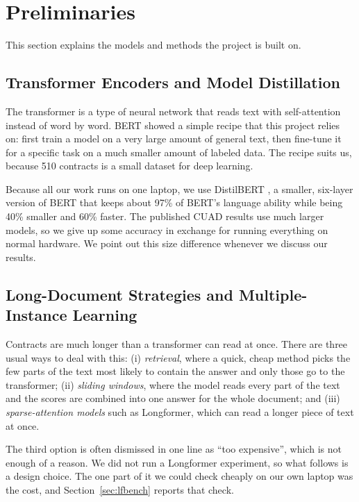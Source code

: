 \section{Preliminaries}
This section explains the models and methods the project is built on.

\subsection{Transformer Encoders and Model Distillation}
The transformer \cite{vaswani2017attention} is a type of neural network that reads text with self-attention instead of word by word. BERT \cite{devlin2019bert} showed a simple recipe that this project relies on: first train a model on a very large amount of general text, then fine-tune it for a specific task on a much smaller amount of labeled data. The recipe suits us, because 510 contracts is a small dataset for deep learning.

Because all our work runs on one laptop, we use DistilBERT \cite{sanh2019distilbert}, a smaller, six-layer version of BERT that keeps about 97\% of BERT's language ability while being 40\% smaller and 60\% faster. The published CUAD results use much larger models, so we give up some accuracy in exchange for running everything on normal hardware. We point out this size difference whenever we discuss our results.

\subsection{Long-Document Strategies and Multiple-Instance Learning}
\label{sec:lit_long}
Contracts are much longer than a transformer can read at once. There are three usual ways to deal with this: (i) \emph{retrieval}, where a quick, cheap method picks the few parts of the text most likely to contain the answer and only those go to the transformer; (ii) \emph{sliding windows}, where the model reads every part of the text and the scores are combined into one answer for the whole document; and (iii) \emph{sparse-attention models} such as Longformer, which can read a longer piece of text at once.

The third option is often dismissed in one line as ``too expensive'', which is not enough of a reason. We did not run a Longformer experiment, so what follows is a design choice. The one part of it we could check cheaply on our own laptop was the cost, and Section~\ref{sec:lfbench} reports that check.

